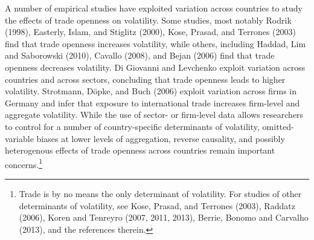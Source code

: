 \documentclass[12pt]{article}
\begin{document}
A number of empirical studies have exploited variation across countries to
study the effects of trade openness on volatility. Some studies, most
notably Rodrik (1998), Easterly, Islam, and Stiglitz (2000), Kose, Prasad,
and Terrones (2003) find that trade openness increases volatility, while
others, including Haddad, Lim and Saborowski (2010), Cavallo (2008), and
Bejan (2006) find that trade openness decreases volatility. Di Giovanni and
Levchenko exploit variation across countries and across sectors, concluding
that trade openness leads to higher volatility. Strotmann, D\"{o}pke, and
Buch (2006) exploit variation across firms in Germany and infer that
exposure to international trade increases firm-level and aggregate
volatility. While the use of sector- or firm-level data allows researchers
to control for a number of country-specific determinants of volatility,
omitted-variable biases at lower levels of aggregation, reverse causality,
and possibly heterogenous effects of trade openness across countries remain
important concerns.\footnote{%
Trade is by no means the only determinant of volatility. For studies of
other determinants of volatility, see Kose, Prasad, and Terrones (2003),
Raddatz (2006), Koren and Tenreyro (2007, 2011, 2013), Berrie, Bonomo and
Carvalho (2013), and the references therein.}
\end{document}
